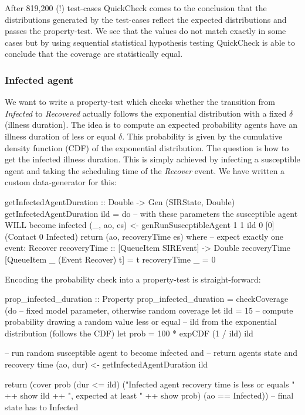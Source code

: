After 819,200 (!) test-cases QuickCheck comes to the conclusion that the distributions generated by the test-cases reflect the expected distributions and passes the property-test. We see that the values do not match exactly in some cases but by using sequential statistical hypothesis testing QuickCheck is able to conclude that the coverage are statistically equal.

\subsubsection{Infected agent}
We want to write a property-test which checks whether the transition from \textit{Infected} to \textit{Recovered} actually follows the exponential distribution with a fixed $\delta$ (illness duration). The idea is to compute an expected probability agents have an illness duration of less or equal $\delta$. This probability is given by the cumulative density function (CDF) of the exponential distribution. The question is how to get the infected illness duration. This is simply achieved by infecting a susceptible agent and taking the scheduling time of the \textit{Recover} event. We have written a custom data-generator for this:

\begin{HaskellCode}
getInfectedAgentDuration :: Double -> Gen (SIRState, Double)
getInfectedAgentDuration ild = do
  -- with these parameters the susceptible agent WILL become infected
  (_, ao, es) <- genRunSusceptibleAgent 1 1 ild 0 [0] (Contact 0 Infected)
  return (ao, recoveryTime es)
  where
    -- expect exactly one event: Recover
    recoveryTime :: [QueueItem SIREvent] -> Double
    recoveryTime [QueueItem _ (Event Recover) t]  = t
    recoveryTime _ = 0
\end{HaskellCode}

Encoding the probability check into a property-test is straight-forward:

\begin{HaskellCode}
prop_infected_duration :: Property
prop_infected_duration = checkCoverage (do
  -- fixed model parameter, otherwise random coverage
  let ild  = 15
  -- compute probability drawing a random value less or equal
  -- ild from the exponential distribution (follows the CDF)
  let prob = 100 * expCDF (1 / ild) ild

  -- run random susceptible agent to become infected and
  -- return agents state and recovery time
  (ao, dur) <- getInfectedAgentDuration ild

  return (cover prob (dur <= ild) 
            ("Infected agent recovery time is less or equals " ++ show ild ++ 
             ", expected at least " ++ show prob) 
            (ao == Infected)) -- final state has to Infected
\end{HaskellCode}

